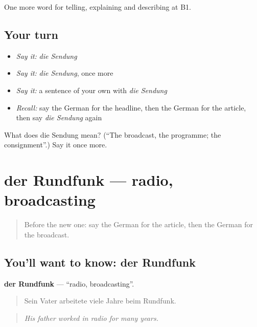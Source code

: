 \begin{grammarlens}[title={What you've built}]
One more word for telling, explaining and describing at B1.
\end{grammarlens}

\subsection*{Your turn}
\begin{itemize}
\raggedright
  \item \emph{Say it:} \emph{die Sendung}
  \item \emph{Say it:} \emph{die Sendung}, once more
  \item \emph{Say it:} a sentence of your own with \emph{die Sendung}
  \item \emph{Recall:} say the German for the headline, then the German for the article, then say \emph{die Sendung} again
\end{itemize}

\begin{tcolorbox}[breakable,colback=teal!4,colframe=teal!35!black,title={Before you move on}]
What does die Sendung mean? (\textquotedblleft{}The broadcast, the programme; the consignment\textquotedblright{}.) Say it once more.
\end{tcolorbox}
\section[der Rundfunk]{der Rundfunk — radio, broadcasting}

\label{lesson:GE-C272-rundfunk}



\begin{quote}
Before the new one: say the German for the article, then the German for the broadcast.
\end{quote}

\subsection*{You'll want to know: der Rundfunk}
\textbf{der Rundfunk} — \textquotedblleft{}radio, broadcasting\textquotedblright{}.

\begin{quote}
Sein Vater arbeitete viele Jahre beim Rundfunk.
\end{quote}

\begin{quote}
\emph{His father worked in radio for many years.}
\end{quote}

